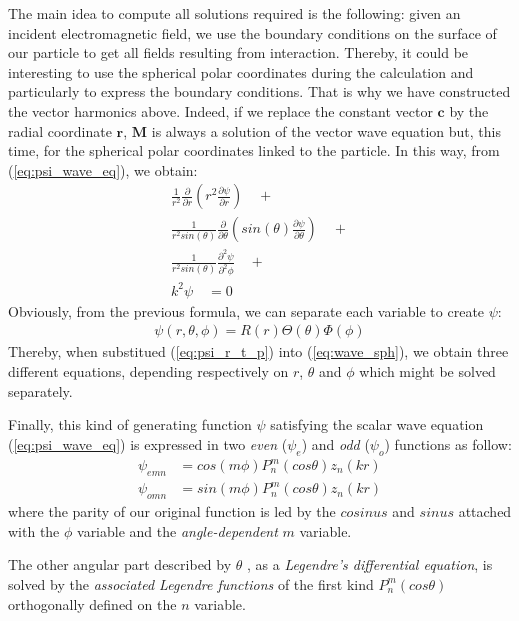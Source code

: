 \documentclass{article}
\numberwithin{equation}{section}
\begin{document}
The main idea to compute all solutions required is the following: given an incident electromagnetic field, we use the boundary conditions on the surface of our particle to get all fields resulting from interaction. Thereby, it could be interesting to use the spherical polar coordinates during the calculation and particularly to express the boundary conditions. That is why we have constructed the vector harmonics above. Indeed, if we replace the constant vector $\textbf{c}$ by the radial coordinate $\textbf{r}$, $\textbf{M}$ is always a solution of the vector wave equation but, this time, for the spherical polar coordinates linked to the particle. In this way, from (\ref{eq:psi_wave_eq}), we obtain:
\begin{equation}\label{eq:wave_sph}
\begin{aligned}
\frac{1}{r^{2}}\frac{\partial }{\partial r}(r^{2}\frac{\partial \psi}{\partial r}) \quad + \\ 
\frac{1}{r^{2}sin(\theta)}\frac{\partial }{\partial \theta}(sin(\theta)\frac{\partial \psi}{\partial \theta}) \quad + \\
\frac{1}{r^{2}sin(\theta)}\frac{\partial^{2} \psi}{\partial^{2} \phi} \quad + \\
k^{2}\psi \quad = 0
\end{aligned}
\end{equation}
Obviously, from the previous formula, we can separate each variable to create $\psi$:
\begin{align}\label{eq:psi_r_t_p}
\psi(r, \theta, \phi) = R(r)\Theta(\theta)\Phi(\phi)
\end{align}
Thereby, when substitued (\ref{eq:psi_r_t_p}) into (\ref{eq:wave_sph}), we obtain three different equations, depending respectively on $r$, $\theta$ and $\phi$ which might be solved separately.

Finally, this kind of generating function $\psi$ satisfying the scalar wave equation (\ref{eq:psi_wave_eq}) is expressed in two \textit{even} ($\psi_{e}$) and \textit{odd} ($\psi_{o}$) functions as follow:
\begin{align}
\psi_{emn}&=cos(m\phi)P_{n}^{m}(cos\theta)z_{n}(kr)\\
\psi_{omn}&=sin(m\phi)P_{n}^{m}(cos\theta)z_{n}(kr)
\end{align}
where the parity of our original function is led by the $cosinus$ and $sinus$ attached with the $\phi$ variable and the \textit{angle-dependent} $m$ variable. 

The other angular part described by $\theta$ , as a \textit{Legendre's differential equation}, is solved by the \textit{associated Legendre functions} of the first kind $P_{n}^{m}(cos\theta)$ orthogonally defined on the $n$ variable. 
\end{document}
